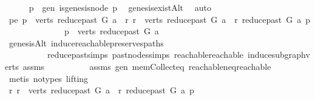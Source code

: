 \begin{isabellebody}
\ \ \ \ \isamarkupfalse%
\ p\ \ gen{\isacharcolon}{\kern0pt}\ {\isachardoublequoteopen}is{\isacharunderscore}{\kern0pt}genesis{\isacharunderscore}{\kern0pt}node\ p{\isachardoublequoteclose}\ \isamarkupfalse%
\ genesis{\isacharunderscore}{\kern0pt}existAlt\ \isamarkupfalse%
\ auto\isanewline
\ \ \ \ \isamarkupfalse%
\ pe{\isacharcolon}{\kern0pt}\ {\isachardoublequoteopen}p\ {\isasymin}\ verts\ {\isacharparenleft}{\kern0pt}reduce{\isacharunderscore}{\kern0pt}past\ G\ a{\isacharparenright}{\kern0pt}\ {\isasymand}\ {\isacharparenleft}{\kern0pt}{\isasymforall}r{\isachardot}{\kern0pt}\ r\ {\isasymin}\ verts\ {\isacharparenleft}{\kern0pt}reduce{\isacharunderscore}{\kern0pt}past\ G\ a{\isacharparenright}{\kern0pt}\ {\isasymlongrightarrow}\ r\ {\isasymrightarrow}\isactrlsup {\isacharasterisk}{\kern0pt}\isactrlbsub reduce{\isacharunderscore}{\kern0pt}past\ G\ a\isactrlesub \ p{\isacharparenright}{\kern0pt}{\isachardoublequoteclose}\isanewline
\ \ \ \ \isamarkupfalse%
\ \isanewline
\ \ \ \ \ \ \isamarkupfalse%
\ {\isachardoublequoteopen}p\ {\isasymin}\ verts\ {\isacharparenleft}{\kern0pt}reduce{\isacharunderscore}{\kern0pt}past\ G\ a{\isacharparenright}{\kern0pt}{\isachardoublequoteclose}\ \isamarkupfalse%
\ genesisAlt\ induce{\isacharunderscore}{\kern0pt}reachable{\isacharunderscore}{\kern0pt}preserves{\isacharunderscore}{\kern0pt}paths\isanewline
\ \ \ \ \ \ \ \ \ \ reduce{\isacharunderscore}{\kern0pt}past{\isachardot}{\kern0pt}simps\ past{\isacharunderscore}{\kern0pt}nodes{\isachardot}{\kern0pt}simps\ reachable{}{\isacharunderscore}{\kern0pt}reachable\ induce{\isacharunderscore}{\kern0pt}subgraph{\isacharunderscore}{\kern0pt}verts\ assms{\isacharparenleft}{\kern0pt}{}{\isacharparenright}{\kern0pt}\isanewline
\ \ \ \ \ \ \ \ \ \ assms{\isacharparenleft}{\kern0pt}{}{\isacharparenright}{\kern0pt}\ gen\ mem{\isacharunderscore}{\kern0pt}Collect{\isacharunderscore}{\kern0pt}eq\ reachable{\isacharunderscore}{\kern0pt}neq{\isacharunderscore}{\kern0pt}reachable{}\isanewline
\ \ \ \ \ \ \ \ \isamarkupfalse%
\ {\isacharparenleft}{\kern0pt}metis\ {\isacharparenleft}{\kern0pt}no{\isacharunderscore}{\kern0pt}types{\isacharcomma}{\kern0pt}\ lifting{\isacharparenright}{\kern0pt}{\isacharparenright}{\kern0pt}\ \isanewline
\isanewline
\ \ \ \ \isamarkupfalse%
\ \ \ \ \isanewline
\ \ \ \ \ \ \isamarkupfalse%
\ {\isachardoublequoteopen}{\isasymforall}r{\isachardot}{\kern0pt}\ r\ {\isasymin}\ verts\ {\isacharparenleft}{\kern0pt}reduce{\isacharunderscore}{\kern0pt}past\ G\ a{\isacharparenright}{\kern0pt}\ {\isasymlongrightarrow}\ r\ {\isasymrightarrow}\isactrlsup {\isacharasterisk}{\kern0pt}\isactrlbsub reduce{\isacharunderscore}{\kern0pt}past\ G\ a\isactrlesub \ p{\isachardoublequoteclose}\ \isanewline

\end{isabellebody}
